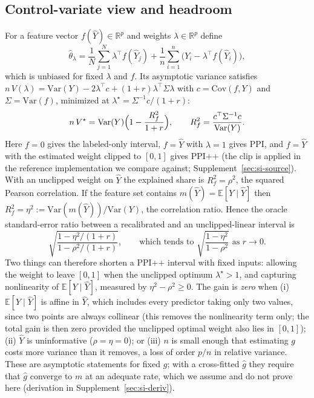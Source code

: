 \documentclass{article}
\newcommand{\Yhat}{\hat Y}
\newcommand{\E}{\mathbb{E}}
\newcommand{\Var}{\mathrm{Var}}
\newcommand{\Cov}{\mathrm{Cov}}
\begin{document}
\subsection{Control-variate view and headroom}\label{sec:theory}
For a feature vector $f(\Yhat)\in\mathbb{R}^p$ and weights $\lambda\in\mathbb{R}^p$ define
\begin{equation}
\hat\theta_\lambda=\frac1N\sum_{j=1}^N\lambda^\top f(\Yhat_j)+\frac1n\sum_{i=1}^n\bigl(Y_i-\lambda^\top f(\Yhat_i)\bigr),
\end{equation}
which is unbiased for fixed $\lambda$ and $f$. Its asymptotic variance satisfies $n\,V(\lambda)=\Var(Y)-2\lambda^\top c+(1+r)\lambda^\top\Sigma\lambda$ with $c=\Cov(f,Y)$ and $\Sigma=\Var(f)$, minimized at $\lambda^\star=\Sigma^{-1}c/(1+r)$:
\begin{equation}
n\,V^\star=\Var(Y)\Bigl(1-\frac{R_f^2}{1+r}\Bigr),\qquad R_f^2=\frac{c^\top\Sigma^{-1}c}{\Var(Y)}.
\label{eq:vstar}
\end{equation}
Here $f=0$ gives the labeled-only interval, $f=\Yhat$ with $\lambda=1$ gives PPI, and $f=\Yhat$ with the estimated weight clipped to $[0,1]$ gives PPI++ (the clip is applied in the reference implementation we compare against; Supplement~\ref{sec:si-source}). With an unclipped weight on $\Yhat$ the explained share is $R_f^2=\rho^2$, the squared Pearson correlation. If the feature set contains $m(\Yhat)=\E[Y\mid\Yhat]$ then $R_f^2=\eta^2:=\Var(m(\Yhat))/\Var(Y)$, the correlation ratio. Hence the oracle standard-error ratio between a recalibrated and an unclipped-linear interval is
\begin{equation}
\sqrt{\frac{1-\eta^2/(1+r)}{1-\rho^2/(1+r)}},\qquad\text{which tends to }\sqrt{\frac{1-\eta^2}{1-\rho^2}}\text{ as }r\to0.
\label{eq:ceiling}
\end{equation}
Two things can therefore shorten a PPI++ interval with fixed inputs: allowing the weight to leave $[0,1]$ when the unclipped optimum $\lambda^\star>1$, and capturing nonlinearity of $\E[Y\mid\Yhat]$, measured by $\eta^2-\rho^2\ge0$. The gain is \emph{zero} when (i) $\E[Y\mid\Yhat]$ is affine in $\Yhat$, which includes every predictor taking only two values, since two points are always collinear (this removes the nonlinearity term only; the total gain is then zero provided the unclipped optimal weight also lies in $[0,1]$); (ii) $\Yhat$ is uninformative ($\rho=\eta=0$); or (iii) $n$ is small enough that estimating $g$ costs more variance than it removes, a loss of order $p/n$ in relative variance. These are asymptotic statements for fixed $g$; with a cross-fitted $\hat g$ they require that $\hat g$ converge to $m$ at an adequate rate, which we assume and do not prove here (derivation in Supplement~\ref{sec:si-deriv}).
\end{document}
